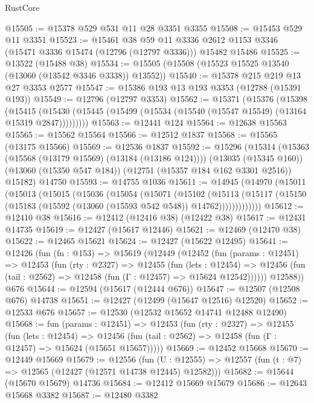\begin{lexlean}{RustCore}
\begin{coremodule}
@15505 := @15378 @529 @531 @11 @28 @3351 @3355
@15508 := @15453 @529 @11 @3351
@15523 := @15461
    @38
    @59
    @11
    @3336
    @2612
    @1153
    @3346
    (@15471 @3336 @15474 (@12796 (@12797 @3336)))
    @15482
    @15486
@15525 := @13522 (@15488 @38)
@15534 := @15505 (@15508 (@15523 @15525 @13540 (@13060 (@13542 @3346 @3338)) @13552))
@15540 := @15378 @215 @219 @13 @27 @3353 @2577
@15547 := @15386 @193 @13 @193 @3353 (@12788 (@15391 @193))
@15549 := @12796 (@12797 @3353)
@15562 := @15371
    (@15376
      (@15398
        (@15415
          (@15430 (@15445 (@15499 (@15534 (@15540 (@15547 @15549) (@13164 @15319 @2847)))))))))
@15563 := @12441 @124
@15564 := @12638 @15563
@15565 := @15562 @15564
@15566 := @12512 @1837
@15568 := @15565 (@13175 @15566)
@15569 := @12536 @1837
@15592 := @15296
    (@15314
      (@15363 (@15568 (@13179 @15569) (@13184 (@13186 @124))))
      (@13035 (@15345 @160))
      (@13060 (@15350 @547 @184))
      (@12751 (@15357 @184 @162 @3301 @2516))
      @15182)
    @14750
@15593 := @14755 @1036
@15611 := @14945
    (@14970
      (@15011
        (@15013
          (@15015
            (@15036
              (@15054
                (@15071
                  (@15102
                    (@15113
                      (@15117
                        (@15150 (@15183 (@15592 (@13060 (@15593 @542 @548)) @14762)))))))))))))
@15612 := @12410 @38
@15616 := @12412 (@12416 @38) (@12422 @38)
@15617 := @12431 @14735
@15619 := @12427 (@15617 @12446)
@15621 := @12469 (@12470 @38)
@15622 := @12465 @15621
@15624 := @12427 (@15622 @12495)
@15641 := @12426
    (fun (fn : @153) =>
    @15619
      (@12449
        (@12452
          (fun (params : @12451) =>
          @12453
            (fun (rty : @2327) =>
            @12455
              (fun (lets : @12454) =>
              @12456 (fun (tail : @2562) => @12458 (fun (Γ : @12457) => @15624 @12542))))))
        @12588))
    @676
@15644 := @12594 (@15617 (@12444 @676))
@15647 := @12507 (@12508 @676) @14738
@15651 := @12427 (@12499 (@15647 @12516) @12520)
@15652 := @12533 @676
@15657 := @12530 (@12532 @15652 @14741 @12488 @12490)
@15668 := fun (params : @12451) =>
  @12453
    (fun (rty : @2327) =>
    @12455
      (fun (lets : @12454) =>
      @12456 (fun (tail : @2562) => @12458 (fun (Γ : @12457) => @15624 (@15651 @15657)))))
@15669 := @12452 @15668
@15670 := @12449 @15669
@15679 := @12556
    (fun (U : @12555) => @12557 (fun (t : @7) => @12565 (@12427 (@12571 @14738 @12445) @12582)))
@15682 := @15644 (@15670 @15679) @14736
@15684 := @12412 @15669 @15679
@15686 := @12643 @15668 @3382
@15687 := @12480 @3382

\end{coremodule}
\end{lexlean}
